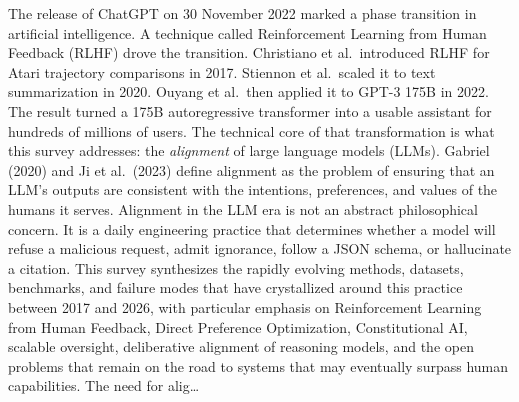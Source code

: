 The release of ChatGPT on 30 November 2022 marked a phase transition in artificial intelligence. A technique called Reinforcement Learning from Human Feedback (RLHF) drove the transition. Christiano et al.~introduced RLHF for Atari trajectory comparisons in 2017. Stiennon et al.~scaled it to text summarization in 2020. Ouyang et al.~then applied it to GPT-3 175B in 2022. The result turned a 175B autoregressive transformer into a usable assistant for hundreds of millions of users. The technical core of that transformation is what this survey addresses: the \emph{alignment} of large language models (LLMs). Gabriel (2020) and Ji et al.~(2023) define alignment as the problem of ensuring that an LLM's outputs are consistent with the intentions, preferences, and values of the humans it serves. Alignment in the LLM era is not an abstract philosophical concern. It is a daily engineering practice that determines whether a model will refuse a malicious request, admit ignorance, follow a JSON schema, or hallucinate a citation. This survey synthesizes the rapidly evolving methods, datasets, benchmarks, and failure modes that have crystallized around this practice between 2017 and 2026, with particular emphasis on Reinforcement Learning from Human Feedback, Direct Preference Optimization, Constitutional AI, scalable oversight, deliberative alignment of reasoning models, and the open problems that remain on the road to systems that may eventually surpass human capabilities. The need for alig\ldots{}
